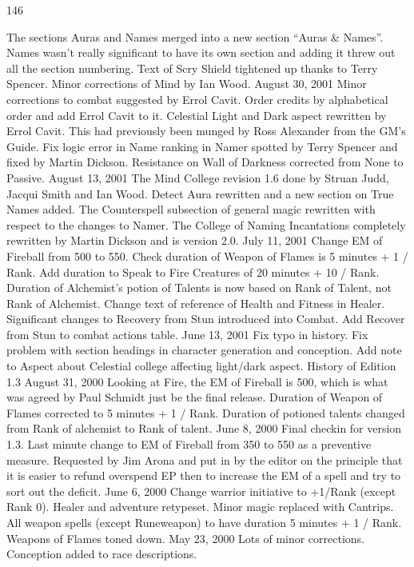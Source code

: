 \documentclass[a4paper]{article}
\begin{document}
\begin{multicols}{3}
146

The sections Auras and Names merged into a new
section “Auras & Names”. Names wasn’t really
significant to have its own section and adding it
threw out all the section numbering. Text of Scry
Shield tightened up thanks to Terry Spencer. Minor
corrections of Mind by Ian Wood.
August 30, 2001 Minor corrections to combat
suggested by Errol Cavit. Order credits by alphabetical order and add Errol Cavit to it. Celestial
Light and Dark aspect rewritten by Errol Cavit.
This had previously been munged by Ross Alexander from the GM’s Guide. Fix logic error in Name
ranking in Namer spotted by Terry Spencer and
fixed by Martin Dickson. Resistance on Wall of
Darkness corrected from None to Passive.
August 13, 2001 The Mind College revision 1.6
done by Struan Judd, Jacqui Smith and Ian Wood.
Detect Aura rewritten and a new section on True
Names added. The Counterspell subsection of
general magic rewritten with respect to the changes
to Namer. The College of Naming Incantations
completely rewritten by Martin Dickson and is
version 2.0.
July 11, 2001 Change EM of Fireball from 500 to
550. Check duration of Weapon of Flames is 5
minutes + 1 / Rank. Add duration to Speak to Fire
Creatures of 20 minutes + 10 / Rank. Duration of
Alchemist’s potion of Talents is now based on
Rank of Talent, not Rank of Alchemist. Change
text of reference of Health and Fitness in Healer.
Significant changes to Recovery from Stun introduced into Combat. Add Recover from Stun to
combat actions table.
June 13, 2001 Fix typo in history. Fix problem
with section headings in character generation and
conception. Add note to Aspect about Celestial
college affecting light/dark aspect.
History of Edition 1.3
August 31, 2000 Looking at Fire, the EM of Fireball is 500, which is what was agreed by Paul
Schmidt just be the final release. Duration of
Weapon of Flames corrected to 5 minutes + 1 /
Rank. Duration of potioned talents changed from
Rank of alchemist to Rank of talent.
June 8, 2000 Final checkin for version 1.3. Last
minute change to EM of Fireball from 350 to 550
as a preventive measure. Requested by Jim Arona
and put in by the editor on the principle that it is
easier to refund overspend EP then to increase the
EM of a spell and try to sort out the deficit.
June 6, 2000 Change warrior initiative to +1/Rank
(except Rank 0). Healer and adventure retypeset.
Minor magic replaced with Cantrips. All weapon
spells (except Runeweapon) to have duration 5
minutes + 1 / Rank. Weapons of Flames toned
down.
May 23, 2000 Lots of minor corrections. Conception added to race descriptions.

\end{multicols}
\end{document}
